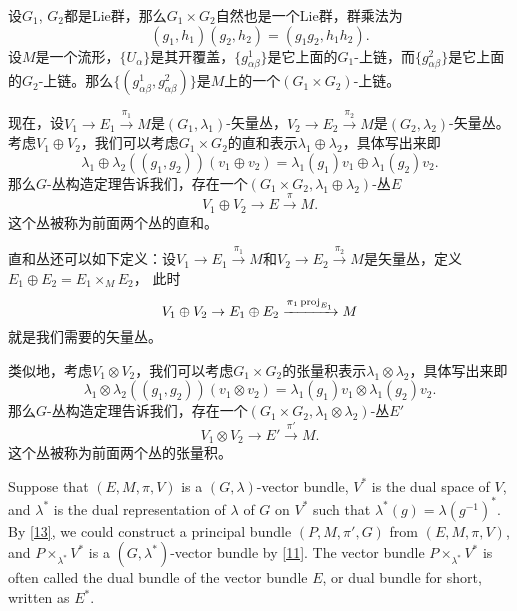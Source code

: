 	\begin{para}[矢量丛的直和与张量积]
	设$G_1$, $G_2$都是Lie群，那么$G_1\times G_2$自然也是一个Lie群，群乘法为
	\[
		(g_1,h_1)(g_2,h_2)=(g_1g_2,h_1h_2).
	\]
	设$M$是一个流形，$\{U_\alpha\}$是其开覆盖，$\{g^1_{\alpha\beta}\}$是它上面的$G_1$-上链，而$\{g^2_{\alpha\beta}\}$是它上面的$G_2$-上链。那么$\{(g^1_{\alpha\beta},g^2_{\alpha\beta})\}$是$M$上的一个$(G_1\times G_2)$-上链。
	
	现在，设$V_1\to E_1\xrightarrow{\pi_1}M$是$(G_1,\lambda_1)$-矢量丛，$V_2\to E_2\xrightarrow{\pi_2}M$是$(G_2,\lambda_2)$-矢量丛。考虑$V_1\oplus V_2$，我们可以考虑$G_1\times G_2$的直和表示$\lambda_1\oplus \lambda_2$，具体写出来即
	\[
		\lambda_1\oplus \lambda_2((g_1,g_2))(v_1\oplus v_2)=\lambda_1(g_1)v_1\oplus \lambda_1(g_2)v_2.
	\]
	那么$G$-丛构造定理告诉我们，存在一个$(G_1\times G_2,\lambda_1\oplus \lambda_2)$-丛$E$
	\[
		V_1\oplus V_2\to E\xrightarrow{\pi} M.
	\]
	这个丛被称为前面两个丛的直和。
	
	直和丛还可以如下定义：设$V_1\to E_1\xrightarrow{\pi_1}M$和$V_2\to E_2\xrightarrow{\pi_2}M$是矢量丛，定义$E_1\oplus E_2 = E_1\times_M E_2$，
	此时
	\[
		V_1\oplus V_2\to E_1\oplus E_2\xrightarrow{\pi_1\operatorname{proj}_{E_1}} M
	\]
	就是我们需要的矢量丛。
	
	
	类似地，考虑$V_1\otimes V_2$，我们可以考虑$G_1\times G_2$的张量积表示$\lambda_1\otimes \lambda_2$，具体写出来即
	\[
		\lambda_1\otimes \lambda_2((g_1,g_2))(v_1\otimes v_2)=\lambda_1(g_1)v_1\otimes \lambda_1(g_2)v_2.
	\]
	那么$G$-丛构造定理告诉我们，存在一个$(G_1\times G_2,\lambda_1\otimes \lambda_2)$-丛$E'$
	\[
		V_1\otimes V_2\to E'\xrightarrow{\pi'} M.
	\]
	这个丛被称为前面两个丛的张量积。
	\end{para}
	
	\begin{para}
		Suppose that $(E,M,\pi,V)$ is a $(G,\lambda)$-vector bundle, $V^*$ is the dual space of $V$, and $\lambda^*$ is the dual representation of $\lambda$ of $G$ on $V^*$ such that $\lambda^*(g)=\lambda(g^{-1})^*$. By \ref{13}, we could construct a principal bundle $(P,M,\pi',G)$ from $(E,M,\pi,V)$, and $P\times_{\lambda^*} V^*$ is a $(G,\lambda^*)$-vector bundle by \ref{11}. The vector bundle $P\times_{\lambda^*} V^*$ is often called the dual bundle of the vector bundle $E$, or dual bundle for short, written as $E^*$.
	\end{para}
	
